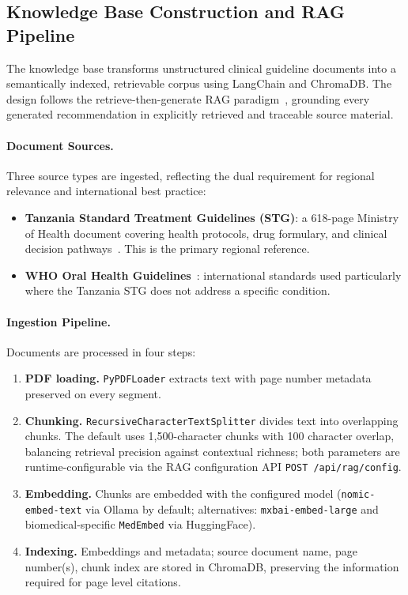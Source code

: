 \documentclass[12pt,a4paper]{report}
\begin{document}
	\subsection{Knowledge Base Construction and RAG Pipeline}
	\label{sec:rag}
	
	The knowledge base transforms unstructured clinical guideline documents into a semantically
	indexed, retrievable corpus using LangChain and ChromaDB. The design follows the
	retrieve-then-generate RAG paradigm~\cite{lewis2020retrieval}, grounding every generated
	recommendation in explicitly retrieved and traceable source material.
	
	\paragraph{Document Sources.}
	Three source types are ingested, reflecting the dual requirement for regional relevance and
	international best practice:
	\begin{itemize}
		\item \textbf{Tanzania Standard Treatment Guidelines (STG)}: a 618-page Ministry of
		Health document covering health protocols, drug formulary, and clinical
		decision pathways~\cite{tanzania_oral_health_policy}. This is the primary regional
		reference.
		\item \textbf{WHO Oral Health Guidelines}~\cite{who_oral_health}: international standards
		used particularly where the Tanzania STG does not address a specific condition.
		
	\end{itemize}
	
	\paragraph{Ingestion Pipeline.}
	Documents are processed in four steps:
	\begin{enumerate}
		\item \textbf{PDF loading.} \texttt{PyPDFLoader} extracts text with page number metadata
		preserved on every segment.
		\item \textbf{Chunking.} \texttt{RecursiveCharacterTextSplitter} divides text into
		overlapping chunks. The default uses 1{,}500-character chunks with 100 character
		overlap, balancing retrieval precision against contextual richness; both parameters are
		runtime-configurable via the RAG configuration API \texttt{POST /api/rag/config}.
		\item \textbf{Embedding.} Chunks are embedded with the configured model
		(\texttt{nomic-embed-text} via Ollama by default; alternatives: \texttt{mxbai-embed-large}
		and biomedical-specific \texttt{MedEmbed} via HuggingFace).
		\item \textbf{Indexing.} Embeddings and metadata; source document name, page number(s),
		chunk index are stored in ChromaDB, preserving the information required for page level
		citations.
	\end{enumerate}
	
\end{document}
